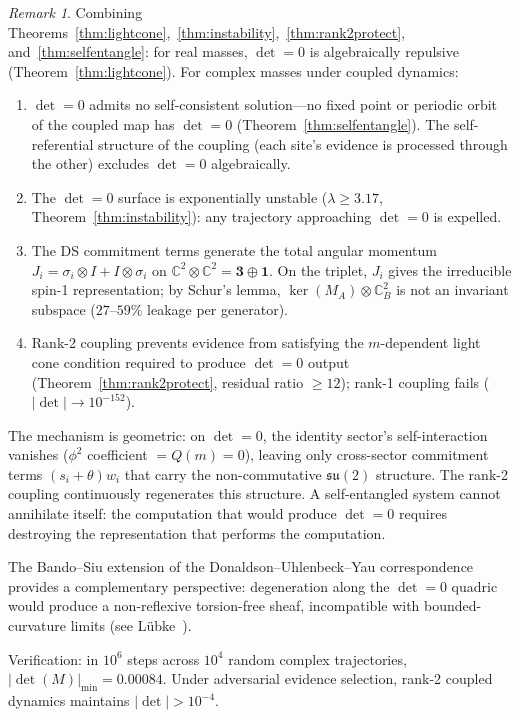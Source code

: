 \documentclass[11pt,a4paper]{article}
\theoremstyle{definition}
\theoremstyle{remark}
\newtheorem{remark}[theorem]{Remark}
\newcommand{\C}{\mathbb{C}}
\newcommand{\su}{\mathfrak{su}}
\begin{document}
\begin{remark}\label{rem:gap4synthesis}
Combining Theorems~\ref{thm:lightcone},~\ref{thm:instability},~\ref{thm:rank2protect}, and~\ref{thm:selfentangle}: for real masses, $\det=0$ is algebraically repulsive (Theorem~\ref{thm:lightcone}). For complex masses under coupled dynamics:
\begin{enumerate}[nosep]
\item $\det=0$ admits no self-consistent solution---no fixed point or periodic orbit of the coupled map has $\det=0$ (Theorem~\ref{thm:selfentangle}). The self-referential structure of the coupling (each site's evidence is processed through the other) excludes $\det=0$ algebraically.
\item The $\det=0$ surface is exponentially unstable ($\lambda\geq 3.17$, Theorem~\ref{thm:instability}): any trajectory approaching $\det=0$ is expelled.
\item The DS commitment terms generate the total angular momentum $J_i=\sigma_i\otimes I+I\otimes\sigma_i$ on $\C^2\otimes\C^2=\mathbf{3}\oplus\mathbf{1}$. On the triplet, $J_i$ gives the irreducible spin-1 representation; by Schur's lemma, $\ker(M_A)\otimes\C^2_B$ is not an invariant subspace ($27$--$59\%$ leakage per generator).
\item Rank-2 coupling prevents evidence from satisfying the $m$-dependent light cone condition required to produce $\det=0$ output (Theorem~\ref{thm:rank2protect}, residual ratio $\geq 12$); rank-1 coupling fails ($|\det|\to 10^{-152}$).
\end{enumerate}

The mechanism is geometric: on $\det=0$, the identity sector's self-interaction vanishes ($\phi^2$ coefficient $=Q(m)=0$), leaving only cross-sector commitment terms $(s_i+\theta)w_i$ that carry the non-commutative $\su(2)$ structure. The rank-2 coupling continuously regenerates this structure. A self-entangled system cannot annihilate itself: the computation that would produce $\det=0$ requires destroying the representation that performs the computation.

The Bando--Siu extension of the Donaldson--Uhlenbeck--Yau correspondence~\cite{BandoSiu1994} provides a complementary perspective: degeneration along the $\det=0$ quadric would produce a non-reflexive torsion-free sheaf, incompatible with bounded-curvature limits (see L\"ubke~\cite{Lubke1983}).

Verification: in $10^6$ steps across $10^4$ random complex trajectories, $|\det(M)|_{\min}=0.00084$. Under adversarial evidence selection, rank-2 coupled dynamics maintains $|\det|>10^{-4}$.
\end{remark}
\end{document}
